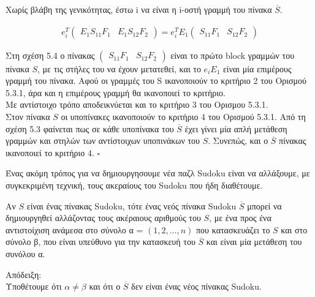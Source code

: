 \documentclass[oneside,12pt]{book}
\theoremstyle{definition}
\begin{document}
Χωρίς βλάβη της γενικότητας, έστω i να είναι η i-οστή γραμμή του πίνακα \(\overline{S}\). 

\begin{align}
	e_{i}^{T} \begin{pmatrix}
				E_{1}S_{11}F_{1} & E_{1}S_{12}F_{2}
			\end{pmatrix} = 
	e_{i}^{T}E_{1} \begin{pmatrix}
	S_{11}F_{1} & S_{12}F_{2}
	\end{pmatrix}		
\end{align}

Στη σχέση 5.4 ο πίνακας \(\begin{pmatrix}
								S_{11}F_{1} & S_{12}F_{2}
						\end{pmatrix}\)
είναι το πρώτο block γραμμών του πίνακα \(S\), με τις στήλες του να έχουν μετατεθεί, και το \(e_{i}E_{1}\) είναι μία επιμέρους γραμμή του πίνακα. Αφού οι γραμμές του S ικανοποιούν το κριτήριο 2 του Ορισμού 5.3.1, άρα και η επιμέρους γραμμή θα ικανοποιεί το κριτήριο. \\

Με αντίστοιχο τρόπο αποδεικνύεται και το κριτήριο 3 του Ορισμου 5.3.1. \\

Στον πίνακα \(S\) οι υποπίνακες ικανοποιούν το κριτήριο 4 του Ορισμού 5.3.1. Από τη σχέση 5.3 φαίνεται πως σε κάθε υποπίνακα του \(\overline{S}\) έχει γίνει μία απλή μετάθεση γραμμών και στηλών των αντίστοιχων υποπινάκων του \(S\). Συνεπώς, και ο \(\overline{S}\) πίνακας ικανοποιεί το κριτήριο 4. \(\square\)

Ένας ακόμη τρόπος για να δημιουργησουμε νέα παζλ Sudoku είναι να αλλάξουμε, με συγκεκριμένη τεχνική, τους ακεραίους του Sudoku που ήδη διαθέτουμε. \par

\begin{theorem}{}{}
	Αν \(S\) είναι ένας πίνακας Sudoku, τότε ένας νεός πίνακα Sudoku \(\overline{S}\) μπορεί να δημιουργηθεί αλλάζοντας τους ακέραιους αριθμούς του \(S\), με ένα προς ένα αντιστοίχιση ανάμεσα στο σύνολο α = \(\left( 1,2,\dots,n\right)\) που κατασκευάζει το \(S\) και στο σύνολο β, που είναι υπεύθυνο για την κατασκευή του \(\overline{S}\) και είναι μία μετάθεση του συνόλου α.
\end{theorem}

Απόδειξη: \\
Υποθέτουμε ότι \(α \neq β\) και ότι ο \(\overline{S}\) δεν είναι ένας νέος πίνακας Sudoku. \\
\end{document}
